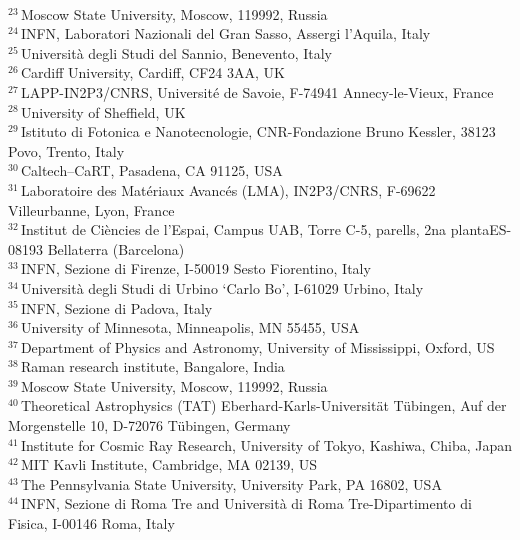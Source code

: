 {\\{$^{23}$\,Moscow State University, Moscow, 119992, Russia}
\\{$^{24}$\,INFN, Laboratori Nazionali del Gran Sasso, Assergi l'Aquila, Italy}
\\{$^{25}$\,Universit\`{a} degli Studi del Sannio, Benevento, Italy}
\\{$^{26}$\,Cardiff University, Cardiff, CF24 3AA, UK}
\\{$^{27}$\,LAPP-IN2P3/CNRS, Universit\'{e} de Savoie, F-74941 Annecy-le-Vieux, France}
\\{$^{28}$\,University of Sheffield, UK}
\\{$^{29}$\,Istituto di Fotonica e Nanotecnologie, CNR-Fondazione Bruno Kessler, 38123 Povo, Trento, Italy}
\\{$^{30}$\,Caltech--CaRT, Pasadena, CA 91125, USA}
\\{$^{31}$\,Laboratoire des Mat\'{e}riaux Avanc\'{e}s (LMA), IN2P3/CNRS, F-69622 Villeurbanne, Lyon, France}
\\{$^{32}$\,Institut de Ci{\`e}ncies de l'Espai, Campus UAB, Torre C-5, parells, 2na plantaES-08193 Bellaterra (Barcelona) }
\\{$^{33}$\,INFN, Sezione di Firenze, I-50019 Sesto Fiorentino, Italy}
\\{$^{34}$\,Universit\`{a} degli Studi di Urbino \textquoteleft Carlo Bo\textquoteright, I-61029 Urbino, Italy}
\\{$^{35}$\,INFN, Sezione di Padova, Italy}
\\{$^{36}$\,University of Minnesota, Minneapolis, MN 55455, USA}
\\{$^{37}$\,Department of Physics and Astronomy, University of Mississippi, Oxford, US}
\\{$^{38}$\,Raman research institute, Bangalore, India}
\\{$^{39}$\,Moscow State University, Moscow, 119992, Russia}
\\{$^{40}$\,Theoretical Astrophysics (TAT) Eberhard-Karls-Universit\"at T\"ubingen, Auf der Morgenstelle 10, D-72076 T\"{u}bingen, Germany}
\\{$^{41}$\,Institute for Cosmic Ray Research, University of Tokyo, Kashiwa, Chiba, Japan}
\\{$^{42}$\,MIT Kavli Institute, Cambridge, MA 02139, US}
\\{$^{43}$\,The Pennsylvania State University, University Park, PA 16802, USA}
\\{$^{44}$\,INFN, Sezione di Roma Tre and Universit\`{a} di Roma Tre-Dipartimento di Fisica, I-00146 Roma, Italy}
}
